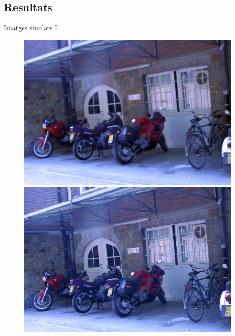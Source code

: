 \documentclass[xcolor=table, 11pt]{beamer}
\newcommand\tz{\fontsize{13}{15.6}\selectfont}
\begin{document}

	\begin{frame}[plain]
		\section{Resultats}
	\end{frame}

	\begin{frame}{Imatges similars I}
		\tz
		\begin{figure}[!htb]
				\includegraphics[width=\linewidth]{images/experiments/motos3}
			\endminipage
			\hspace*{0.2cm}
				\includegraphics[width=\linewidth]{images/experiments/motos1}
			\endminipage


\end{figure}
\end{frame}
\end{document}
